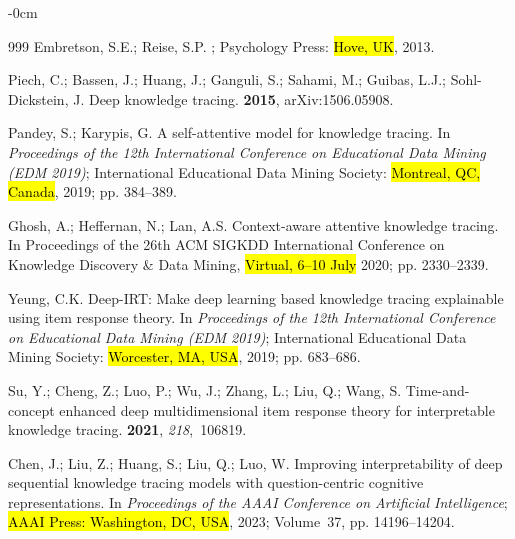\documentclass[applsci,article,accept,moreauthors,pdftex]{Definitions/mdpi}
\begin{document}
\begin{adjustwidth}{-\extralength}{0cm}
\begin{thebibliography}{999}
Embretson, S.E.; Reise, S.P.
; Psychology Press: \hl{Hove, UK},
  2013.

Piech, C.; Bassen, J.; Huang, J.; Ganguli, S.; Sahami, M.; Guibas, L.J.;
  Sohl-Dickstein, J.
\newblock Deep knowledge tracing.
 {\bf 2015},
  arXiv:1506.05908.

Pandey, S.; Karypis, G.
\newblock A self-attentive model for knowledge tracing.
\newblock In \textit{Proceedings of the 12th International
  Conference on Educational Data Mining (EDM 2019)}; International Educational
  Data Mining Society: \hl{Montreal, QC, Canada},  2019; pp. 384--389.
\newblock 

Ghosh, A.; Heffernan, N.; Lan, A.S.
\newblock Context-aware attentive knowledge tracing.
\newblock In Proceedings of the 26th ACM SIGKDD International Conference on
  Knowledge Discovery \& Data Mining, \hl{Virtual, 6--10 July} %
 2020; pp. 2330--2339.

Yeung, C.K.
\newblock Deep-IRT: Make deep learning based knowledge tracing explainable
  using item response theory.
\newblock In \textit{Proceedings of the 12th International
  Conference on Educational Data Mining (EDM 2019)}; International Educational
  Data Mining Society: \hl{Worcester, MA, USA},  2019; pp. 683--686.


Su, Y.; Cheng, Z.; Luo, P.; Wu, J.; Zhang, L.; Liu, Q.; Wang, S.
\newblock Time-and-concept enhanced deep multidimensional item response theory
  for interpretable knowledge tracing.
 {\bf 2021}, {\em 218},~106819.

Chen, J.; Liu, Z.; Huang, S.; Liu, Q.; Luo, W.
\newblock Improving interpretability of deep sequential knowledge tracing
  models with question-centric cognitive representations.
\newblock In \textit{Proceedings of the AAAI Conference on
  Artificial Intelligence}; \hl{AAAI Press: Washington, DC, USA},  2023; Volume~37, pp. 14196--14204.


\end{thebibliography}
\end{adjustwidth}
\end{document}
